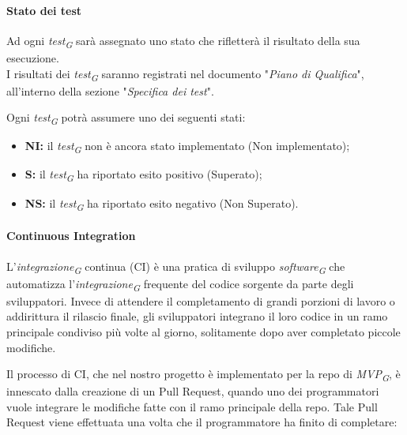 \paragraph{Stato dei test}
Ad ogni \textit{test}\textsubscript{\textit{G}} sarà assegnato uno stato che rifletterà il risultato della sua esecuzione. \\
I risultati dei \textit{test}\textsubscript{\textit{G}} saranno registrati nel documento "\textit{Piano di Qualifica}", all'interno della sezione "\textit{Specifica dei test}".

\vspace{0.2cm}

Ogni \textit{test}\textsubscript{\textit{G}} potrà assumere uno dei seguenti stati:

\begin{itemize}
    \item \textbf{NI:} 
        il \textit{test}\textsubscript{\textit{G}} non è ancora stato implementato (Non implementato); 
    \item \textbf{S:} 
        il \textit{test}\textsubscript{\textit{G}} ha riportato esito positivo (Superato); 
    \item \textbf{NS:}
        il \textit{test}\textsubscript{\textit{G}} ha riportato esito negativo (Non Superato).
\end{itemize}

\paragraph{Continuous Integration}
L'\textit{integrazione}\textsubscript{\textit{G}} continua (CI) è una pratica di sviluppo \textit{software}\textsubscript{\textit{G}} che automatizza l'\textit{integrazione}\textsubscript{\textit{G}} frequente del codice sorgente da parte degli sviluppatori. Invece di attendere il completamento di grandi porzioni di lavoro o addirittura il rilascio finale, gli sviluppatori integrano il loro codice in un ramo principale condiviso più volte al giorno, solitamente dopo aver completato piccole modifiche.

\vspace{0.2cm}

Il processo di CI, che nel nostro progetto è implementato per la repo di \textit{MVP}\textsubscript{\textit{G}}, è innescato dalla creazione di un Pull Request, quando uno dei programmatori vuole integrare le modifiche fatte con il ramo principale della repo. Tale Pull Request viene effettuata una volta che il programmatore ha finito di completare:

